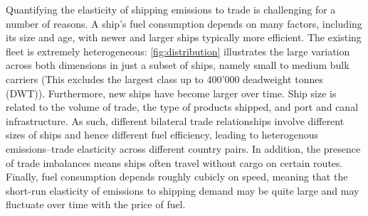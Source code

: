 \documentclass[hidelinks, 12pt,letterpaper]{article}
\begin{document}
Quantifying the elasticity of shipping emissions to trade is challenging for a number of reasons. A ship's fuel consumption depends on many factors, including its size and age, with newer and larger ships typically more efficient. The existing fleet is extremely heterogeneous: \autoref{fig:distribution} illustrates the large variation across both dimensions in just a subset of ships, namely small to medium bulk carriers (This excludes the largest class up to 400'000 deadweight tonnes (DWT)). Furthermore, new ships have become larger over time. Ship size is related to the volume of trade, the type of products shipped, and port and canal infrastructure. As such, different bilateral trade relationships involve different sizes of ships and hence different fuel efficiency, leading to heterogenous emissions--trade elasticity across different country pairs. In addition, the presence of trade imbalances means ships often travel without cargo on certain routes. Finally, fuel consumption depends roughly cubicly on speed, meaning that the short-run elasticity of emissions to shipping demand may be quite large and may fluctuate over time with the price of fuel. 
\end{document}
